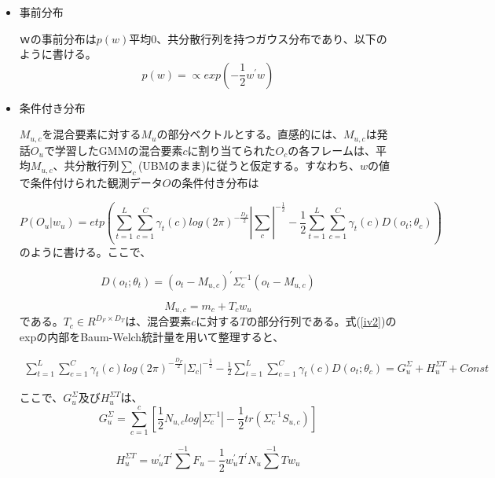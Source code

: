 \begin{itemize}
\item 事前分布\par
$ｗ$の事前分布は$p(w)$平均0、共分散行列を持つガウス分布であり、以下のように書ける。
\begin{equation}
\label{iv1}
p(w)=\propto exp(-\frac{1}{2}w^{\prime}w)
\end{equation}

\item 条件付き分布\par
$M_{u,c}$を混合要素に対する$M_u$の部分ベクトルとする。直感的には、$M_{u,c}$は発話$O_u$で学習したGMMの混合要素$c$に割り当てられた$O_c$の各フレームは、平均$M_{u,c}$、共分散行列$\sum_{c}$(UBMのまま)に従うと仮定する。すなわち、$w$の値で条件付けられた観測データ$O$の条件付き分布は

\begin{equation}
\label{iv2}
P(O_u|w_u)=etp\left(\sum_{t=1}^{L}\sum_{c=1}^{C}\gamma_t(c)log(2\pi )^{-\frac{D_F}{2}}\left|\sum_{c}\right|^{-\frac{1}{2}}-\frac{1}{2}\sum_{t=1}^{L}\sum_{c=1}^{C}\gamma_t(c)D(o_t;\theta_c) \right)
\end{equation}
のように書ける。ここで、

\begin{equation}
D(o_t;\theta_t)=(o_t-M_{u,c})^\prime \Sigma_{c}^{-1}(o_t-M_{u,c})
\end{equation}

\begin{equation}
M_{u,c}=m_c+T_cw_u
\end{equation}
である。$T_c\in R^{D_F\times D_T}$は、混合要素$c$に対する$T$の部分行列である。式(\ref{iv2})のexpの内部をBaum-Welch統計量を用いて整理すると、

\begin{equation}
\begin{split}
\sum_{t=1}^{L}\sum_{c=1}^{C}\gamma_t(c)log(2\pi )^{-\frac{D_F}{2}}\left|\Sigma_{c}\right|^{-\frac{1}{2}}-\frac{1}{2}\sum_{t=1}^{L}\sum_{c=1}^{C}\gamma_t(c)D(o_t;\theta_c)=G_u^\Sigma+H_u^{\Sigma T}+Const
\end{split}
\end{equation}

ここで、$G_u^\Sigma$及び$H_u^{\Sigma T}$は、
\begin{equation}
G_u^\Sigma=\sum_{c=1}^c\left[\frac{1}{2}N_{u,c}log\left|\Sigma_c^{-1}\right|-\frac{1}{2}tr\left(\Sigma_c^{-1}S_{u,c}\right)\right]
\end{equation}

\begin{equation}
\label{iv3}
H_u^{\Sigma T}=w_u^\prime T^\prime \sum^{-1}F_u-\frac{1}{2}w_u^\prime T^\prime N_u\sum^{-1}Tw_u
\end{equation}


\end{itemize}
